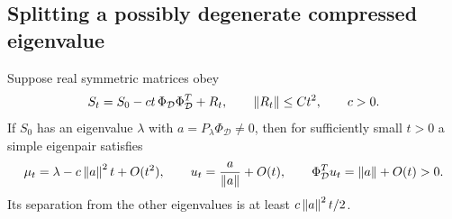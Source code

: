 \subsection{Splitting a possibly degenerate compressed eigenvalue}

\begin{lemma}
\label{d:lem:physical-branch}
Suppose real symmetric matrices obey
\[
 S_t=S_0-ct\,\Phi_{\mathcal D}\Phi_{\mathcal D}^T+R_t,\qquad
 \left\lVert R_t\right\rVert\le Ct^2,\qquad c>0.
\]
If \(S_0\) has an eigenvalue \(\lambda\) with
\(a=P_\lambda\Phi_{\mathcal D}\ne0\), then for sufficiently small \(t>0\) a simple
eigenpair satisfies
\[
 \mu_t=\lambda-c\left\lVert a\right\rVert^2t+O(t^2),\qquad
 u_t=\frac{a}{\left\lVert a\right\rVert}+O(t),\qquad
 \Phi_{\mathcal D}^Tu_t=\left\lVert a\right\rVert+O(t)>0.
\]
Its separation from the other eigenvalues is at least
\(c\left\lVert a\right\rVert^2t/2\).
\end{lemma}

